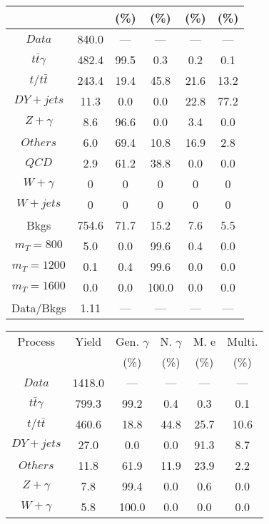 \begin{figure}
\begin{minipage}[c]{0.32\textwidth}
{\begin{tabular}{cccccc}
 &  & (\%) & (\%) & (\%) & (\%)  \\
\hline
                                                                      $ Data $ &  840.0 &  --- &  --- &  --- &  ---\\
$ t\bar{t}\gamma $ &  482.4 &  99.5 &  0.3 &  0.2 &  0.1\\
$ t/t\bar{t} $ &  243.4 &  19.4 &  45.8 &  21.6 &  13.2\\
$ DY+jets $ &  11.3 &  0.0 &  0.0 &  22.8 &  77.2\\
$ Z+\gamma $ &  8.6 &  96.6 &  0.0 &  3.4 &  0.0\\
$ Others $ &  6.0 &  69.4 &  10.8 &  16.9 &  2.8\\
$ QCD $ &  2.9 &  61.2 &  38.8 &  0.0 &  0.0\\
$ W+\gamma $ &  0 &  0 &  0 &  0 &  0\\
$ W+jets $ &  0 &  0 &  0 &  0 &  0\\
Bkgs &  754.6 &  71.7 &  15.2 &  7.6 &  5.5\\
$ m_{T} = 800 $ &  5.0 &  0.0 &  99.6 &  0.4 &  0.0\\
$ m_{T} = 1200 $ &  0.1 &  0.4 &  99.6 &  0.0 &  0.0\\
$ m_{T} = 1600 $ &  0.0 &  0.0 &  100.0 &  0.0 &  0.0\\
Data/Bkgs &  1.11 &  --- &  --- &  --- &  ---\\
\hline
\end{tabular}
}
\end{minipage}
\begin{minipage}[c]{0.32\textwidth}
\centering
\tiny{
\begin{tabular}{cccccc}
\hline
Process & Yield & Gen. $\gamma$ & N. $\gamma$ & M. e & Multi. \\
 &  & (\%) & (\%) & (\%) & (\%)  \\
\hline
                                                                      $ Data $ &  1418.0 &  --- &  --- &  --- &  ---\\
$ t\bar{t}\gamma $ &  799.3 &  99.2 &  0.4 &  0.3 &  0.1\\
$ t/t\bar{t} $ &  460.6 &  18.8 &  44.8 &  25.7 &  10.6\\
$ DY+jets $ &  27.0 &  0.0 &  0.0 &  91.3 &  8.7\\
$ Others $ &  11.8 &  61.9 &  11.9 &  23.9 &  2.2\\
$ Z+\gamma $ &  7.8 &  99.4 &  0.0 &  0.6 &  0.0\\
$ W+\gamma $ &  5.8 &  100.0 &  0.0 &  0.0 &  0.0\\

\end{tabular}}
\end{minipage}
\end{figure}
